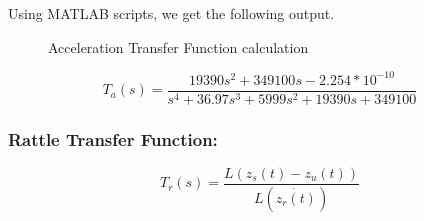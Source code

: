 \documentclass[12pt, a4paper, oneside]{report}
\begin{document}
    Using MATLAB scripts, we get the following output.
\begin{figure}[h]
    \centering
    
    \hfill
    \par 
    \caption{Acceleration Transfer Function calculation}
    \label{fig: open_loop1}
\end{figure}

\begin{equation}
    \label{eq:open_loop1}
    T_a(s) = \frac{ 19390 s^2 + 349100 s - 2.254 *10^{-10}}{s^4 + 36.97 s^3 + 5999 s^2 + 19390 s + 349100}
\end{equation}

\subsubsection{Rattle Transfer Function:}
    \begin{equation}
        T_r(s) = \frac{L(z_s(t) - z_u(t))}{L(\dot{z_r(t)})}
    \end{equation}
\end{document}
